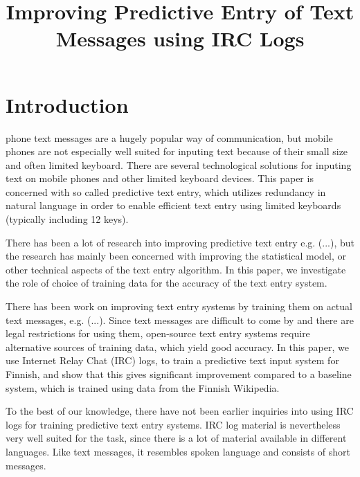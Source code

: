 \documentclass[a4paper,conference]{IEEEtran}
\title{Improving Predictive Entry of Text Messages using IRC Logs}
\author{
\IEEEauthorblockA{\ldots\\
\ldots\\
\ldots\\
\ldots}
\and
\IEEEauthorblockA{\ldots\\
\ldots\\
\ldots\\
\ldots}
\and
\IEEEauthorblockA{\ldots\\
\ldots\\
\ldots\\
\ldots}
}
\begin{document}
\maketitle


\begin{abstract}

\end{abstract}

\section{Introduction}
\label{sec:introduction}

 phone text messages are a hugely popular way
of communication, but mobile phones are not especially well suited for
inputing text because of their small size and often limited
keyboard. There are several technological solutions for inputing text
on mobile phones and other limited keyboard devices. This paper is
concerned with so called predictive text entry, which utilizes
redundancy in natural language in order to enable efficient text entry
using limited keyboards (typically including 12 keys).

There has been a lot of research into improving predictive text entry
e.g. (...), but the research has mainly been concerned with improving
the statistical model, or other technical aspects of the text entry
algorithm. In this paper, we investigate the role of choice of training
data for the accuracy of the text entry system. 

There has been work on improving text entry systems by training them
on actual text messages, e.g. (...). Since text messages are difficult
to come by and there are legal restrictions for using them,
open-source text entry systems require alternative sources of training
data, which yield good accuracy. In this paper, we use Internet Relay
Chat (IRC) logs, to train a predictive text input system for Finnish,
and show that this gives significant improvement compared to a
baseline system, which is trained using data from the Finnish
Wikipedia. 

To the best of our knowledge, there have not been earlier inquiries
into using IRC logs for training predictive text entry systems. IRC
log material is nevertheless very well suited for the task, since
there is a lot of material available in different languages. Like text
messages, it resembles spoken language and consists of short messages.
\end{document}

